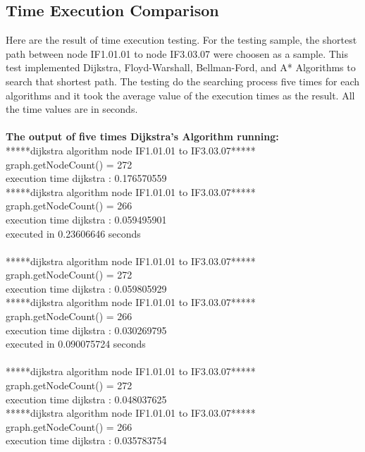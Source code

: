\subsection{Time Execution Comparison}
Here are the result of time execution testing. For the testing sample, the shortest path between node IF1.01.01 to node IF3.03.07 were choosen as a sample. This test implemented Dijkstra, Floyd-Warshall, Bellman-Ford, and A* Algorithms to search that shortest path. The testing do the searching process five times for each algorithms and it took the average value of the execution times as the result. All the time values are in seconds. 
\\\\
\textbf{The output of five times Dijkstra's Algorithm running:}\\
*****dijkstra algorithm node IF1.01.01 to IF3.03.07*****\\
graph.getNodeCount() = 272\\
execution time dijkstra : 0.176570559\\
*****dijkstra algorithm node IF1.01.01 to IF3.03.07*****\\
graph.getNodeCount() = 266\\
execution time dijkstra : 0.059495901\\
executed in 0.23606646 seconds\\
\\
*****dijkstra algorithm node IF1.01.01 to IF3.03.07*****\\
graph.getNodeCount() = 272\\
execution time dijkstra : 0.059805929\\
*****dijkstra algorithm node IF1.01.01 to IF3.03.07*****\\
graph.getNodeCount() = 266\\
execution time dijkstra : 0.030269795\\
executed in 0.090075724 seconds\\
\\
*****dijkstra algorithm node IF1.01.01 to IF3.03.07*****\\
graph.getNodeCount() = 272\\
execution time dijkstra : 0.048037625\\
*****dijkstra algorithm node IF1.01.01 to IF3.03.07*****\\
graph.getNodeCount() = 266\\
execution time dijkstra : 0.035783754\\
